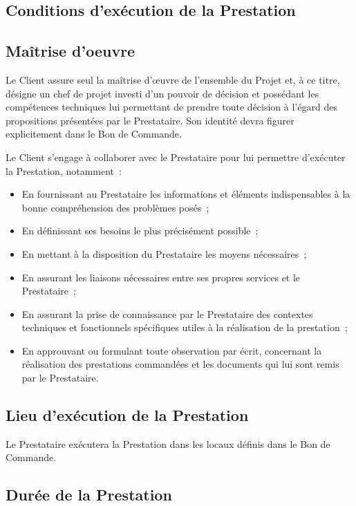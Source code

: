 \documentclass[9pt,french]{base}
\begin{document}
\begin{multicols*}{3}
\section{Conditions d’exécution de la Prestation}

\subsection{Maîtrise d’oeuvre}

Le Client assure seul la maîtrise d’œuvre de l’ensemble du Projet et, à ce titre, désigne un chef de projet investi d’un pouvoir de décision et possédant les compétences techniques lui permettant de prendre toute décision à l’égard des propositions présentées par le Prestataire. Son identité devra figurer explicitement dans le Bon de Commande.

Le Client s’engage à collaborer avec le Prestataire pour lui permettre d’exécuter la Prestation, notamment~:
\begin{itemize}
  \item En fournissant au Prestataire les informations et éléments indispensables à la bonne compréhension des problèmes posés~;
  \item En définissant ses besoins le plus précisément possible~;
  \item En mettant à la disposition du Prestataire les moyens nécessaires~;
  \item En assurant les liaisons nécessaires entre ses propres services et le Prestataire~;
  \item En assurant la prise de connaissance par le Prestataire des contextes techniques et fonctionnels spécifiques utiles à la réalisation de la prestation~;
  \item En approuvant ou formulant toute observation par écrit, concernant la réalisation des prestations commandées et les documents qui lui sont remis par le Prestataire.
\end{itemize}

\subsection{Lieu d’exécution de la Prestation}

Le Prestataire exécutera la Prestation dans les locaux définis dans le Bon de Commande.

\subsection{Durée de la Prestation}


\end{multicols*}
\end{document}

